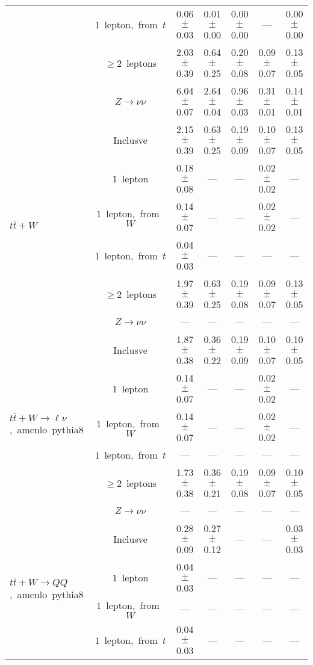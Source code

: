 \documentclass{article}
\begin{document}
\begin{longtable}{|l|c|c|c|c|c|c|}
 & $1$~lepton,~from~$t$  & 0.06 $\pm$ 0.03  & 0.01 $\pm$ 0.00  & 0.00 $\pm$ 0.00  & ---  & 0.00 $\pm$ 0.00 \\* 
 & $\ge2$~leptons  & 2.03 $\pm$ 0.39  & 0.64 $\pm$ 0.25  & 0.20 $\pm$ 0.08  & 0.09 $\pm$ 0.07  & 0.13 $\pm$ 0.05 \\* 
 & $Z\rightarrow\nu\nu$  & 6.04 $\pm$ 0.07  & 2.64 $\pm$ 0.04  & 0.96 $\pm$ 0.03  & 0.31 $\pm$ 0.01  & 0.14 $\pm$ 0.01 \\* 
\hline 
\multirow{6}{*}{$t\bar{t}+W$} & Inclusve  & 2.15 $\pm$ 0.39  & 0.63 $\pm$ 0.25  & 0.19 $\pm$ 0.09  & 0.10 $\pm$ 0.07  & 0.13 $\pm$ 0.05 \\* 
 & $1$~lepton  & 0.18 $\pm$ 0.08  & ---  & ---  & 0.02 $\pm$ 0.02  & --- \\* 
 & $1$~lepton,~from~$W$  & 0.14 $\pm$ 0.07  & ---  & ---  & 0.02 $\pm$ 0.02  & --- \\* 
 & $1$~lepton,~from~$t$  & 0.04 $\pm$ 0.03  & ---  & ---  & ---  & --- \\* 
 & $\ge2$~leptons  & 1.97 $\pm$ 0.39  & 0.63 $\pm$ 0.25  & 0.19 $\pm$ 0.08  & 0.09 $\pm$ 0.07  & 0.13 $\pm$ 0.05 \\* 
 & $Z\rightarrow\nu\nu$  & ---  & ---  & ---  & ---  & --- \\* 
\hline 
\multirow{6}{*}{$t\bar{t}+W{\rightarrow}{\ell}{\nu}$,~amcnlo~pythia8} & Inclusve  & 1.87 $\pm$ 0.38  & 0.36 $\pm$ 0.22  & 0.19 $\pm$ 0.09  & 0.10 $\pm$ 0.07  & 0.10 $\pm$ 0.05 \\* 
 & $1$~lepton  & 0.14 $\pm$ 0.07  & ---  & ---  & 0.02 $\pm$ 0.02  & --- \\* 
 & $1$~lepton,~from~$W$  & 0.14 $\pm$ 0.07  & ---  & ---  & 0.02 $\pm$ 0.02  & --- \\* 
 & $1$~lepton,~from~$t$  & ---  & ---  & ---  & ---  & --- \\* 
 & $\ge2$~leptons  & 1.73 $\pm$ 0.38  & 0.36 $\pm$ 0.21  & 0.19 $\pm$ 0.08  & 0.09 $\pm$ 0.07  & 0.10 $\pm$ 0.05 \\* 
 & $Z\rightarrow\nu\nu$  & ---  & ---  & ---  & ---  & --- \\* 
\hline 
\multirow{6}{*}{$t\bar{t}+W{\rightarrow}QQ$,~amcnlo~pythia8} & Inclusve  & 0.28 $\pm$ 0.09  & 0.27 $\pm$ 0.12  & ---  & ---  & 0.03 $\pm$ 0.03 \\* 
 & $1$~lepton  & 0.04 $\pm$ 0.03  & ---  & ---  & ---  & --- \\* 
 & $1$~lepton,~from~$W$  & ---  & ---  & ---  & ---  & --- \\* 
 & $1$~lepton,~from~$t$  & 0.04 $\pm$ 0.03  & ---  & ---  & ---  & --- \\* 

\end{longtable}
\end{document}
